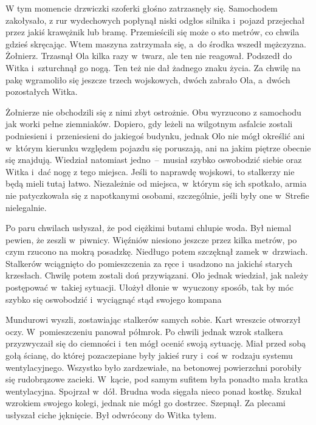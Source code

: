\documentclass[../MAIN.tex]{subfiles}
\begin{document}
W tym momencie drzwiczki szoferki głośno zatrzasnęły się. Samochodem zakołysało, z rur wydechowych popłynął niski odgłos silnika i~pojazd przejechał przez jakiś krawężnik lub bramę. Przemieścili się może o sto metrów, co chwila gdzieś skręcając. Wtem maszyna zatrzymała się, a~do środka wszedł mężczyzna. Żołnierz. Trzasnął Ola kilka razy w~twarz, ale ten nie reagował. Podszedł do Witka i~szturchnął go nogą. Ten też nie dał żadnego znaku życia. Za chwilę na pakę wgramoliło się jeszcze trzech wojskowych, dwóch zabrało Ola, a~dwóch pozostałych Witka.

Żołnierze nie obchodzili się z nimi zbyt ostrożnie. Obu wyrzucono z samochodu jak worki pełne ziemniaków. Dopiero, gdy leżeli na wilgotnym asfalcie zostali podniesieni i~przeniesieni do jakiegoś budynku, jednak Olo nie mógł określić ani w~którym kierunku względem pojazdu się poruszają, ani na jakim piętrze obecnie się znajdują. Wiedział natomiast jedno~--~musiał szybko oswobodzić siebie oraz Witka i~dać nogę z tego miejsca. Jeśli to naprawdę wojskowi, to stalkerzy nie będą mieli tutaj łatwo. Niezależnie od miejsca, w~którym się ich spotkało, armia nie patyczkowała się z napotkanymi osobami, szczególnie, jeśli były one w~Strefie nielegalnie.

Po paru chwilach usłyszał, że pod ciężkimi butami chlupie woda. Był niemal pewien, że zeszli w~piwnicy. Więźniów niesiono jeszcze przez kilka metrów, po czym rzucono na mokrą posadzkę. Niedługo potem szczęknął zamek w~drzwiach. Stalkerów wciągnięto do pomieszczenia za ręce i~usadzono na jakichś starych krzesłach. Chwilę potem zostali doń przywiązani. Olo jednak wiedział, jak należy postępować w~takiej sytuacji. Ułożył dłonie w~wyuczony sposób, tak by móc szybko się oswobodzić i~wyciągnąć stąd swojego kompana

Mundurowi wyszli, zostawiając stalkerów samych sobie. Kart wreszcie otworzył oczy. W~pomieszczeniu panował półmrok. Po chwili jednak wzrok stalkera przyzwyczaił się do ciemności i~ten mógł ocenić swoją sytuację. Miał przed sobą gołą ścianę, do której pozaczepiane były jakieś rury i~coś w~rodzaju systemu wentylacyjnego. Wszystko było zardzewiałe, na betonowej powierzchni porobiły się rudobrązowe zacieki. W~kącie, pod samym sufitem była ponadto mała kratka wentylacyjna. Spojrzał w~dół. Brudna woda sięgała nieco ponad kostkę. Szukał wzrokiem swojego kolegi, jednak nie mógł go dostrzec. Szepnął. Za plecami usłyszał ciche jęknięcie. Był odwrócony do Witka tyłem.
\end{document}
